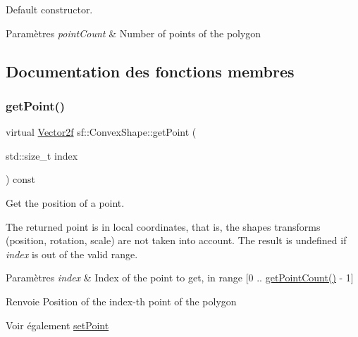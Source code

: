 Default constructor. 


\begin{DoxyParams}{Paramètres}
{\em point\+Count} & Number of points of the polygon \\
\hline
\end{DoxyParams}


\subsection{Documentation des fonctions membres}
\mbox{\label{classsf_1_1ConvexShape_a72a97bc426d8daf4d682a20fcb7f3fe7}} 
\subsubsection{\texorpdfstring{get\+Point()}{getPoint()}}
{\footnotesize\ttfamily virtual \hyperlink{classsf_1_1Vector2}{Vector2f} sf\+::\+Convex\+Shape\+::get\+Point (\begin{DoxyParamCaption}\item[{std\+::size\+\_\+t}]{index }\end{DoxyParamCaption}) const\hspace{0.3cm}{\ttfamily [virtual]}}



Get the position of a point. 

The returned point is in local coordinates, that is, the shape\textquotesingle{}s transforms (position, rotation, scale) are not taken into account. The result is undefined if {\itshape index} is out of the valid range.


\begin{DoxyParams}{Paramètres}
{\em index} & Index of the point to get, in range \mbox{[}0 .. \hyperlink{classsf_1_1ConvexShape_a0c54b8d48fe4e13414f6e667dbfc22a3}{get\+Point\+Count()} -\/ 1\mbox{]}\\
\hline
\end{DoxyParams}
\begin{DoxyReturn}{Renvoie}
Position of the index-\/th point of the polygon
\end{DoxyReturn}
\begin{DoxySeeAlso}{Voir également}
\hyperlink{classsf_1_1ConvexShape_a5929e0ab0ba5ca1f102b40c234a8e92d}{set\+Point} 
\end{DoxySeeAlso}


